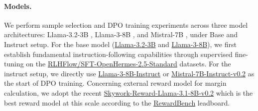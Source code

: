 \paragraph{Models.} We perform sample selection and DPO training experiments across three model architectures: Llama-3.2-3B \citep{llama32}, Llama-3-8B \citep{dubey2024llama}, and Mistral-7B \citep{jiang2023mistral}, under Base and Instruct setup. For the base model (\href{https://huggingface.co/meta-llama/Llama-3.2-3B}{Llama-3.2-3B} and \href{https://huggingface.co/meta-llama/Meta-Llama-3-8B}{Llama-3-8B}), we first establish fundamental instruction-following capabilities through supervised fine-tuning on the \href{https://huggingface.co/datasets/RLHFlow/SFT-OpenHermes-2.5-Standard}{RLHFlow/SFT-OpenHermes-2.5-Standard} datasets. For the instruct setup, we directly use \href{https://huggingface.co/meta-llama/Meta-Llama-3-8B-Instruct}{Llama-3-8B-Instruct} or \href{https://huggingface.co/mistralai/Mistral-7B-Instruct-v0.2}{Mistral-7B-Instruct-v0.2} as the start of DPO training. Concerning external reward model for margin calculation, we adopt the recent \href{https://huggingface.co/Skywork/Skywork-Reward-Llama-3.1-8B-v0.2}{Skywork-Reward-Llama-3.1-8B-v0.2} \citep{liu2024skywork} which is the best reward model at this scale according to the \href{https://huggingface.co/spaces/allenai/reward-bench}{RewardBench} leadboard.

